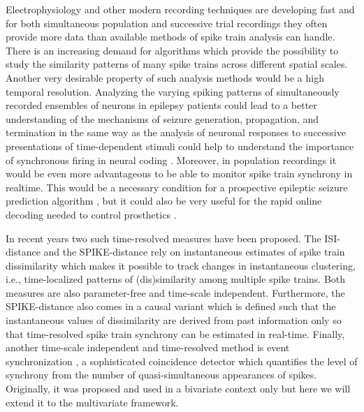 \documentclass[10pt,twocolumn]{elsart5p}
\begin{document}
Electrophysiology and other modern recording techniques are developing fast and for both simultaneous population and successive trial recordings they often provide more data than available methods of spike train analysis can handle. There is an increasing demand for algorithms which provide the possibility to study the similarity patterns of many spike trains across different spatial scales. Another very desirable property of such analysis methods would be a high temporal resolution. Analyzing the varying spiking patterns of simultaneously recorded ensembles of neurons in epilepsy patients could lead to a better understanding of the mechanisms of seizure generation, propagation, and termination \citep{Truccolo11, Bower12} in the same way as the analysis of neuronal responses to successive presentations of time-dependent stimuli could help to understand the importance of synchronous firing in neural coding \citep{Miller08}. Moreover, in population recordings it would be even more advantageous to be able to monitor spike train synchrony in realtime. This would be a necessary condition for a prospective epileptic seizure prediction algorithm \citep{Mormann07}, but it could also be very useful for the rapid online decoding needed to control prosthetics \citep{Hochberg06, Sanchez08}.

In recent years two such time-resolved measures have been proposed. The ISI-distance \citep{Kreuz07c} and the SPIKE-distance \citep{Kreuz13} rely on instantaneous estimates of spike train dissimilarity which makes it possible to track changes in instantaneous clustering, i.e., time-localized patterns of (dis)similarity among multiple spike trains. Both measures are also parameter-free and time-scale independent. Furthermore, the SPIKE-distance also comes in a causal variant \citep{Kreuz13} which is defined such that the instantaneous values of dissimilarity are derived from past information only so that time-resolved spike train synchrony can be estimated in real-time. Finally, another time-scale independent and time-resolved method is event synchronization \citep{QuianQuiroga02b}, a sophisticated coincidence detector which quantifies the level of synchrony from the number of quasi-simultaneous appearances of spikes. Originally, it was proposed and used in a bivariate context only but here we will extend it to the multivariate framework.
\end{document}
